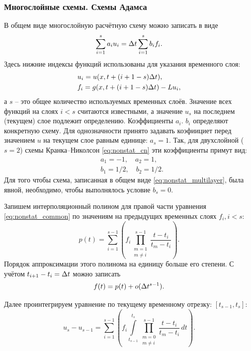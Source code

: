 \subsubsection{Многослойные схемы. Схемы Адамса}
В общем виде многослойную расчётную схему можно записать в виде
\begin{equation}
\label{eq:nonstat_multilayer}
\sum\limits_{i=1}^{s} a_i u_i = \Delta t \sum\limits_{i=1}^{s} b_i f_i.
\end{equation}
Здесь нижние индексы функций использованы для указания временного слоя:
\begin{equation*}
\begin{aligned}
&u_i = u(x, t + (i+1-s)\Delta t),\\
&f_i = g(x, t + (i+1-s)\Delta t) - Lu_i,
\end{aligned}
\end{equation*}
а $s$ -- это общее количество используемых временных слоёв.
Значение всех функций на слоях $i<s$ считаются известными, а значение $u_s$ на последнем (текущем) слое подлежит определению.
Коэффициенты $a_i$. $b_i$ определяют конкретную схему.
Для однозначности принято задавать коэфиициет перед значением $u$ на текущем слое равным единице: $a_s = 1$.
Так, для двухслойной ($s=2$) схемы Кранка--Николсон \cref{eq:nonstat_cn} эти коэффициенты примут вид:
\begin{align*}
&a_1 = -1, \quad a_2 = 1,\\
&b_1 = 1/2, \quad b_2 = 1/2.
\end{align*}
Для того чтобы схема, записанная в общем виде \cref{eq:nonstat_multilayer}, была явной,
необходимо, чтобы выполнялось условие $b_s = 0$.

Запишем интерполяционный полином для правой части уравнения \cref{eq:nonstat_common}
по значениям на предыдущих временных слоях $f_i, i<s$:
\begin{equation*}
p(t) = \sum\limits_{i=1}^{s-1}\left(f_i \prod\limits_{\substack{m=1\\m \neq i}}^{s-1} \frac{t - t_i}{t_m - t_i} \right).
\end{equation*}
Порядок аппроксимации этого полинома на единицу больше его степени. С учётом 
$t_{i+1} - t_{i} = \Delta t$ можно записать
\begin{equation*}
f(t) = p(t) + o(\Delta t^{s-1}).
\end{equation*}

Далее проинтегрируем уравнение по текущему временному отрезку: $[t_{s-1}, t_{s}]$:
\begin{equation*}
u_s - u_{s-1} = \sum_{i=1}^{s-1}\left( f_i \int\limits_{t_{s-1}}^{t_s} \prod \limits_{\substack{m=0\\m\neq i}}^{s-1} \frac{t - t_i}{t_m - t_i}\, dt \right).
\end{equation*}

